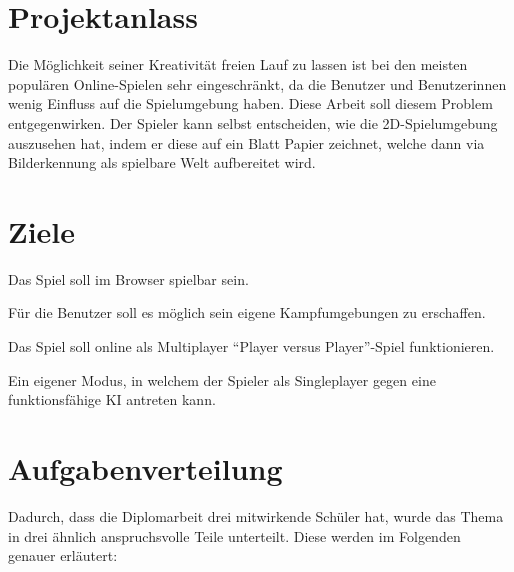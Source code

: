 \section{Projektanlass}
Die Möglichkeit seiner Kreativität freien Lauf zu lassen ist bei den meisten populären
Online-Spielen sehr eingeschränkt, da die Benutzer und Benutzerinnen wenig Einfluss auf die Spielumgebung haben.
Diese Arbeit soll diesem Problem entgegenwirken. Der Spieler kann selbst entscheiden,
wie die 2D-Spielumgebung auszusehen hat, indem er diese auf ein Blatt Papier zeichnet,
welche dann via Bilderkennung als spielbare Welt aufbereitet wird.

\section{Ziele}
\begin{compactitem}
    \item Das Spiel soll im Browser spielbar sein.
    \item Für die Benutzer soll es möglich sein eigene Kampfumgebungen zu erschaffen.
    \item Das Spiel soll online als Multiplayer ``Player versus Player''-Spiel funktionieren.
    \item Ein eigener Modus, in welchem der Spieler als Singleplayer gegen eine funktionsfähige KI antreten kann.
\end{compactitem}

\section{Aufgabenverteilung}
Dadurch, dass die Diplomarbeit drei mitwirkende Schüler hat, wurde das Thema in drei ähnlich
anspruchsvolle Teile unterteilt. Diese werden im Folgenden genauer erläutert:

